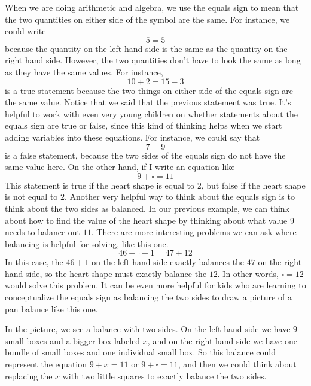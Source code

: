 \documentclass{ximera}
\begin{document}
When we are doing arithmetic and algebra, we use the equals sign to mean that the two quantities on either side of the symbol are the same. For instance, we could write
\[
5 = 5
\]
because the quantity on the left hand side is the same as the quantity on the right hand side. However, the two quantities don't have to look the same as long as they have the same values. For instance, 
\[
10 + 2 = 15 - 3
\]
is a true statement because the two things on either side of the equals sign are the same value. Notice that we said that the previous statement was true. It's helpful to work with even very young children on whether statements about the equals sign are true or false, since this kind of thinking helps when we start adding variables into these equations. For instance, we could say that 
\[
7 = 9
\]
is a false statement, because the two sides of the equals sign do not have the same value here. On the other hand, if I write an equation like
\[
9 + \square = 11
\]
This statement is true if the heart shape is equal to $2$, but false if the heart shape is not equal to $2$. Another very helpful way to think about the equals sign is to think about the two sides as balanced. In our previous example, we can think about how to find the value of the heart shape by thinking about what value $9$ needs to balance out $11$. There are more interesting problems we can ask where balancing is helpful for solving, like this one.
\[
46 + \square + 1 = 47 + 12 
\]
In this case, the $46 + 1$ on the left hand side exactly balances the $47$ on the right hand side, so the heart shape must exactly balance the $12$. In other words, $\square = 12$ would solve this problem. It can be even more helpful for kids who are learning to conceptualize the equals sign as balancing the two sides to draw a picture of a pan balance like this one.
\begin{center}
\end{center}
In the picture, we see a balance with two sides. On the left hand side we have $9$ small boxes and a bigger box labeled $x$, and on the right hand side we have one bundle of small boxes and one individual small box. So this balance could represent the equation $9 + x = 11$ or $9 + \square = 11$, and then we could think about replacing the $x$ with two little squares to exactly balance the two sides.
\end{document}

